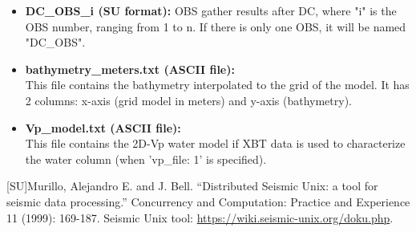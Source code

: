 \documentclass[11pt, oneside]{article}   	%
\begin{document}
\begin{itemize}
 
 \item \textbf{DC\_OBS\_i (SU format):} OBS gather results after DC, where "i" is the OBS number, ranging from 1 to n. If there is only one OBS, it will be named "DC\_OBS".
    
 \item \textbf{bathymetry\_meters.txt (ASCII file):}\\
 This file contains the bathymetry interpolated to the grid of the model. It has 2 columns: x-axis (grid model in meters) and y-axis (bathymetry).
 
 \item \textbf{Vp\_model.txt (ASCII file):}\\
 This file contains the 2D-Vp water model if XBT data is used to characterize the water column (when 'vp\_file: 1' is specified).
 
\end{itemize}



\begin{thebibliography}{999}

[SU]Murillo, Alejandro E. and J. Bell. “Distributed Seismic Unix: a tool for seismic data processing.” Concurrency and Computation: Practice and Experience 11 (1999): 169-187. Seismic Unix tool: \url{https://wiki.seismic-unix.org/doku.php}.

\end{thebibliography}
\end{document}
